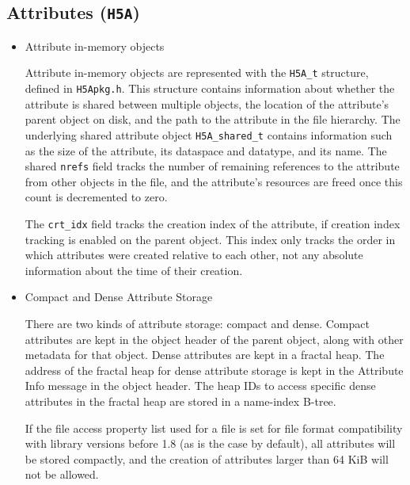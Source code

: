 \subsection{Attributes (\texttt{H5A})}



\begin{itemize}
    \item Attribute in-memory objects

Attribute in-memory objects are represented with the \texttt{H5A\_t} structure, defined in \texttt{H5Apkg.h}. This structure contains information about whether the attribute is shared between multiple objects, the location of the attribute's parent object on disk, and the path to the attribute in the file hierarchy. The underlying shared attribute object \texttt{H5A\_shared\_t} contains information such as the size of the attribute, its dataspace and datatype, and its name. The shared \texttt{nrefs} field tracks the number of remaining references to the attribute from other objects in the file, and the attribute's resources are freed once this count is decremented to zero.

The \texttt{crt\_idx} field tracks the creation index of the attribute, if creation index tracking is enabled on the parent object. This index only tracks the order in which attributes were created relative to each other, not any absolute information about the time of their creation.

    \item Compact and Dense Attribute Storage

There are two kinds of attribute storage: compact and dense. Compact attributes are kept in the object header of the parent object, along with other metadata for that object. Dense attributes are kept in a fractal heap. The address of the fractal heap for dense attribute storage is kept in the Attribute Info message in the object header. The heap IDs to access specific dense attributes in the fractal heap are stored in a name-index B-tree.

If the file access property list used for a file is set for file format compatibility with library versions before 1.8 (as is the case by default), all attributes will be stored compactly, and the creation of attributes larger than 64 KiB will not be allowed.


\end{itemize}
